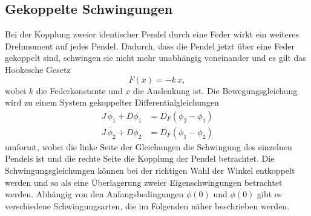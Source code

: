 \subsection{Gekoppelte Schwingungen} %
\label{subsec:Schwingungen}
 Bei der Kopplung zweier identischer Pendel durch eine Feder wirkt ein weiteres Drehmoment auf jedes Pendel.
 Dadurch, dass die Pendel jetzt über eine Feder gekoppelt sind, schwingen sie nicht mehr unabhängig voneinander und es gilt das Hookesche Gesetz
 \begin{equation*}
     F(x) = -k \, x ,
 \end{equation*}
 wobei $k$ die Federkonstante und $x$ die Auslenkung ist.
 Die Bewegungsgleichung wird zu einem System gekoppelter Differentialgleichungen
 \begin{align}
     J \, \ddot{\phi_1} + D \phi_1 &= D_F (\phi_2 - \phi_1) \\
     J \, \ddot{\phi_2} + D \phi_2 &= D_F (\phi_1 - \phi_2)
 \end{align}
 umformt, wobei die linke Seite der Gleichungen die Schwingung des einzelnen Pendels ist und die rechte Seite die Kopplung der Pendel betrachtet.
 Die Schwingungsgleichungen können bei der richtigen Wahl der Winkel entkoppelt werden und so als eine Überlagerung zweier Eigenschwingungen betrachtet werden.
 Abhängig von den Anfangsbedingungen $\phi(0)$ und $\dot{\phi(0)}$ gibt es verschiedene Schwingungsarten, die im Folgenden näher beschrieben werden.

